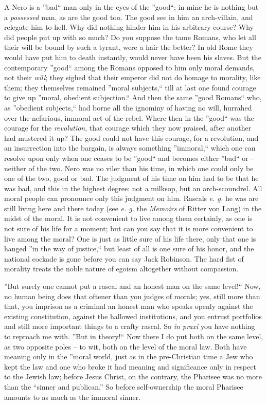 \documentclass[12pt,a4paper]{book}
\begin{document}
A Nero is a ''bad`` man only in the eyes of the ''good``; in mine he is 
nothing but a \textit{possessed} man, as are the good too. The good see in him 
an arch-villain, and relegate him to hell. Why did nothing hinder him in his 
arbitrary course? Why did people put up with so much? Do you suppose the tame 
Romans, who let all their will be bound by such a tyrant, were a hair the 
better? In old Rome they would have put him to death instantly, would never 
have been his slaves. But the contemporary ''good`` among the Romans opposed 
to him only moral demands, not their \textit{will}; they sighed that their 
emperor did not do homage to morality, like them; they themselves remained 
''moral subjects,`` till at last one found courage to give up ''moral, 
obedient subjection.`` And then the same ''good Romans`` who, as 
''obedient subjects,`` had borne all the ignominy of having no will, 
hurrahed over the nefarious, immoral act of the rebel. Where then in the 
''good`` was the courage for the \textit{revolution}, that courage which 
they now praised, after another had mustered it up? The good could not have 
this courage, for a revolution, and an insurrection into the bargain, is 
always something ''immoral,`` which one can resolve upon only when one 
ceases to be ''good`` and becomes either ''bad`` or -- neither of the two. 
Nero was no viler than his time, in which one could only be one of the two, 
good or bad. The judgment of his time on him had to be that he was bad, and 
this in the highest degree: not a milksop, but an arch-scoundrel. All moral 
people can pronounce only this judgment on him. Rascals \textit{e. g.} he was 
are still living here and there today (see \textit{e. g.} the \textit{Memoirs} 
of Ritter von Lang) in the midst of the moral. It is not convenient to live 
among them certainly, as one is not sure of his life for a moment; but can you 
say that it is more convenient to live among the moral? One is just as little 
sure of his life there, only that one is hanged ''in the way of justice,`` 
but least of all is one sure of his honor, and the national cockade is gone 
before you can say Jack Robinson. The hard fist of morality treats the noble 
nature of egoism altogether without compassion.

''But surely one cannot put a rascal and an honest man on the same level!`` 
Now, no human being does that oftener than you judges of morals; yes, still 
more than that, you imprison as a criminal an honest man who speaks openly 
against the existing constitution, against the hallowed institutions, and you 
entrust portfolios and still more important things to a crafty rascal. So 
\textit{in praxi} you have nothing to reproach me with. ''But in theory!`` 
Now there I do put both on the same level, as two opposite poles -- to wit, 
both on the level of the moral law. Both have meaning only in the ''moral 
world, just as in the pre-Christian time a Jew who kept the law and one who 
broke it had meaning and significance only in respect to the Jewish law; 
before Jesus Christ, on the contrary, the Pharisee was no more than the 
``sinner and publican.'' So before self-ownership the moral Pharisee amounts 
to as much as the immoral sinner.
\end{document}
